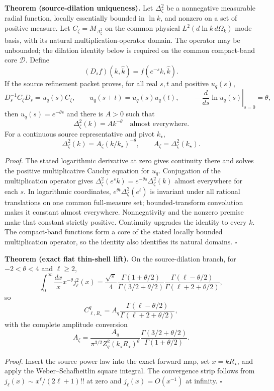 \textbf{Theorem (source-dilation uniqueness).}
\label{thm:oph330-source-dilation-uniqueness}
Let $\Delta_\zeta^2$ be a nonnegative measurable radial function, locally
essentially bounded in $\ln k$, and nonzero on a set of positive measure.
Let $C_\zeta=M_{\Delta_\zeta^2}$ on the common physical
$L^2(d\ln k\,d\Omega_k)$ mode basis, with its natural multiplication-operator
domain. The operator may be unbounded; the dilation identity below is required
on the common compact-band core $\mathcal D$. Define
\[
 (D_sf)(k,\hat k)=f(e^{-s}k,\hat k).
\]
If the source refinement packet proves, for all real $s,t$ and positive
$u_q(s)$,
\[
 D_s^{-1}C_\zeta D_s=u_q(s)C_\zeta,
 \qquad
 u_q(s+t)=u_q(s)u_q(t),
 \qquad
 -\left.\frac{d}{ds}\ln u_q(s)\right|_{s=0}=\theta,
\]
then $u_q(s)=e^{-\theta s}$ and there is $A>0$ such that
\[
 \Delta_\zeta^2(k)=Ak^{-\theta}\quad\text{almost everywhere}.
\]
For a continuous source representative and pivot $k_\star$,
\[
 \boxed{\Delta_\zeta^2(k)=A_\zeta(k/k_\star)^{-\theta}},
 \qquad A_\zeta=\Delta_\zeta^2(k_\star).
\]

\textit{Proof.}
The stated logarithmic derivative at zero gives continuity there and solves
the positive multiplicative Cauchy equation for $u_q$.
Conjugation of the multiplication operator gives
$\Delta_\zeta^2(e^sk)=e^{-\theta s}\Delta_\zeta^2(k)$ almost everywhere for
each $s$.  In logarithmic coordinates,
$e^{\theta t}\Delta_\zeta^2(e^t)$ is invariant under all rational translations
on one common full-measure set; bounded-transform convolution makes it constant
almost everywhere. Nonnegativity and the nonzero premise make that constant
strictly positive. Continuity upgrades the identity to every $k$.
The compact-band functions form a core of the stated locally bounded
multiplication operator, so the identity also identifies its natural domains.
\hfill$\square$

\textbf{Theorem (exact flat thin-shell lift).}
\label{thm:oph330-exact-flat-thin-shell-lift}
On the source-dilation branch, for $-2<\theta<4$ and $\ell\ge2$,
\[
 \int_0^\infty\frac{dx}{x}x^{-\theta}j_\ell^2(x)
 =\frac{\sqrt\pi}{4}
  \frac{\Gamma(1+\theta/2)}{\Gamma(3/2+\theta/2)}
  \frac{\Gamma(\ell-\theta/2)}{\Gamma(\ell+2+\theta/2)},
\]
so
\[
 C_{\ell,R_\star}^q
 =A_q\frac{\Gamma(\ell-\theta/2)}
            {\Gamma(\ell+2+\theta/2)},
\]
with the complete amplitude conversion
\[
 \boxed{
 A_\zeta
 =\frac{A_q}{\pi^{3/2}Z_q^2(k_\star R_\star)^\theta}
  \frac{\Gamma(3/2+\theta/2)}{\Gamma(1+\theta/2)}.}
\]

\textit{Proof.}
Insert the source power law into the exact forward map, set $x=kR_\star$, and
apply the Weber--Schafheitlin square integral.  The convergence strip follows
from $j_\ell(x)\sim x^\ell/(2\ell+1)!!$ at zero and $j_\ell(x)=O(x^{-1})$ at
infinity.  \hfill$\square$

